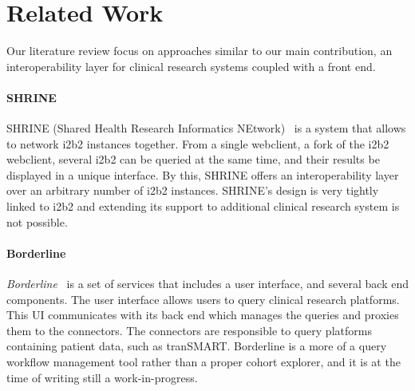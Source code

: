 \section{Related Work}

Our literature review focus on approaches similar to our main contribution, an interoperability layer for clinical research systems coupled with a front end.


\paragraph{SHRINE}

SHRINE (Shared Health Research Informatics NEtwork)~\cite{shrine} is a system that allows to network i2b2 instances together.
From a single webclient, a fork of the i2b2 webclient, several i2b2 can be queried at the same time, and their results be displayed in a unique interface.
By this, SHRINE offers an interoperability layer over an arbitrary number of i2b2 instances.
SHRINE's design is very tightly linked to i2b2 and extending its support to additional clinical research system is not possible.


\paragraph{Borderline}

\emph{Borderline}~\cite{borderline} is a set of services that includes a user interface, and several back end components.
The user interface allows users to query clinical research platforms.
This UI communicates with its back end which manages the queries and proxies them to the connectors.
The connectors are responsible to query platforms containing patient data, such as tranSMART.
Borderline is a more of a query workflow management tool rather than a proper cohort explorer, and it is at the time of writing still a work-in-progress.






